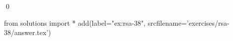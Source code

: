 
\begin{ex} 
  \label{ex:rsa-38}
  
  \qed
\end{ex} 
\begin{python0}
from solutions import *
add(label="ex:rsa-38",
    srcfilename='exercises/rsa-38/answer.tex') 
\end{python0}
